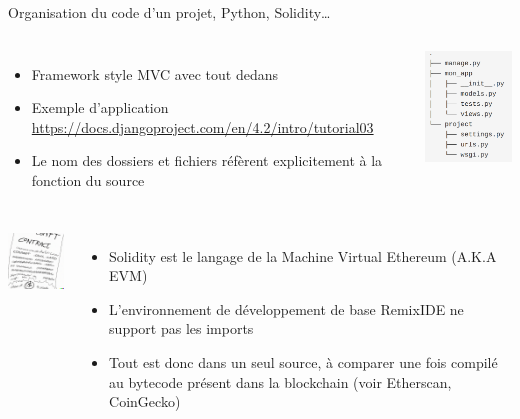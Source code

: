 \documentclass{beamer}
\begin{document}
    \begin{frame}{Organisation du code d'un projet, Python, Solidity\ldots}

        \begin{columns}


            \begin{itemize}

                \item Framework style MVC avec tout dedans
                \item Exemple d'application \url{https://docs.djangoproject.com/en/4.2/intro/tutorial03}
                \item Le nom des dossiers et fichiers réfèrent explicitement à la fonction du source

            \end{itemize}


            \centering
            \includegraphics[width=3cm]{image/flask-project-structure}

        \end{columns}

        \begin{columns}


            \centering
            \includegraphics[width=3cm]{image/smart-contract}

            \begin{itemize}

                \item Solidity est le langage de la Machine Virtual Ethereum (A.K.A EVM)
                \item L'environnement de développement de base RemixIDE ne support pas les imports
                \item Tout est donc dans un seul source, à comparer une fois compilé au bytecode présent dans la blockchain (voir Etherscan, CoinGecko)

            \end{itemize}


        \end{columns}

    \end{frame}
\end{document}
